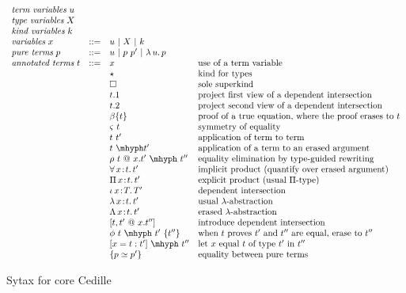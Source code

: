 \documentclass{article}
\newcommand{\abs}[4]{{#1}\, #2\! : \! #3.\, #4}
\newcommand{\absu}[3]{{#1}\, #2.\, #3}
\begin{document}
\begin{figure}
\[
\begin{array}{llll}
  \textit{term variables}\ u & \ & \ &\ \\
  \textit{type variables}\ X & \ & \ &\ \\
  \textit{kind variables}\ k & \ & \ &\ \\
  \textit{variables}\ x & ::= & u\ |\ X\ |\ k &\ \\  
  \textit{pure terms}\ p & ::= & u\ |\ p\ p'\ |\ \absu{\lambda}{u}{p} &\ \\
  \textit{annotated terms}\ t & ::= & x\ & \textnormal{use of a term variable} \\
  \ &\ & \star&\textnormal{kind for types}\\
  \ &\ & \Box&\textnormal{sole superkind} \\
  \ &\ & t.1 & \textnormal{project first view of a dependent intersection}\\
  \ &\ & t.2 & \textnormal{project second view of a dependent intersection}\\
  \ &\ & \beta\{t\} &\textnormal{proof of a true equation, where the proof erases to }t  \\
  \ &\ & \varsigma\ t &\textnormal{symmetry of equality}  \\
  \ &\ & t\ t' & \textnormal{application of term to term}\\
  \ &\ & t\ \mhyph t' & \textnormal{application of a term to an erased argument}\\
  \ &\ & \rho\ t\ @\ x.t'\ \mhyph\ t''&\textnormal{equality elimination by type-guided rewriting}  \\ 
  \ &\ & \abs{\forall}{x}{t}{t'}\ &\textnormal{implicit product (quantify over erased argument)} \\
  \ &\ & \abs{\Pi}{x}{t}{t'}\ &\textnormal{explicit product (usual }\Pi\textnormal{-type)} \\
  \ &\ & \abs{\iota}{x}{T}{T'}\ &\textnormal{dependent intersection} \\
  \ &\ & \abs{\lambda}{x}{t}{t'} & \textnormal{usual }\lambda\textnormal{-abstraction} \\
  \ &\ & \abs{\Lambda}{x}{t}{t'} & \textnormal{erased }\lambda\textnormal{-abstraction}\\
  \ &\ & [ t , t' \ @\ x.t'' ] & \textnormal{introduce dependent intersection}\\
  \ &\ & \phi\ t\ \mhyph\ t'\ \{t''\} & \textnormal{when }t\textnormal{ proves }t'\textnormal{ and }t''
                                   \textnormal{ are equal, erase to }t'' \\
  \ & \ & [ x = t : t' ]\ \mhyph\ t'' & \textnormal{let }x\textnormal{ equal }t\textnormal{ of type }t'\textnormal{ in }t'' \\
  \ &\ & \{ p \simeq p' \} &\textnormal{equality between pure terms}
\end{array}
  \]
  \caption{Sytax for core Cedille}
  \label{fig:syntax}
\end{figure}
\end{document}
